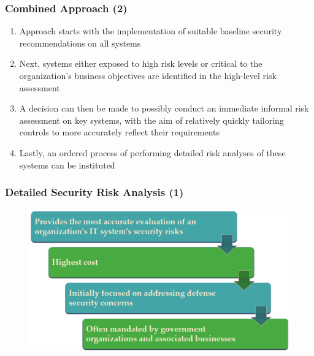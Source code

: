 \documentclass[xcolor ={table,usenames,dvipsnames}]{beamer}
\theoremstyle{definition}
\begin{document}
	\begin{frame}
		\frametitle{Combined Approach (2)}
		\begin{enumerate}
			\item Approach starts with the implementation of suitable baseline security recommendations on all systems
			\item Next, systems either exposed to high risk levels or critical to the organization's business objectives are identified in the high-level risk assessment
			\item A decision can then be made to possibly conduct an immediate informal risk assessment on key systems, with the aim of relatively quickly tailoring controls to more accurately reflect their requirements
			\item Lastly, an ordered process of performing detailed risk analyses of these systems can be instituted
		\end{enumerate}
	\end{frame}

	\begin{frame}
		\frametitle{Detailed Security Risk Analysis (1)}
		\begin{figure}[h!]
			\centering
			\includegraphics[scale=0.27]{img/img_09.PNG}
			\label{Interfacce di un CS}
		\end{figure}
		\end{frame}
	
\end{document}

